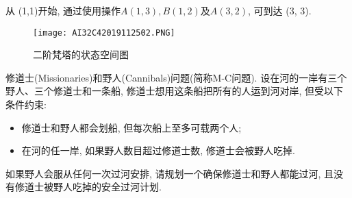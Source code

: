 \begin{example}
从 (1,1)开始, 通过使用操作$A(1, 3),B(1, 2)$及$A(3, 2)$, 可到达 (3, 3).
\begin{figure}[H]
\centering
\texttt{[image: AI32C42019112502.PNG]}
\caption{二阶梵塔的状态空间图}
\label{AI32fig2019120223}
\end{figure}
\end{example}
\begin{example}
  修道士(Missionaries)和野人(Cannibals)问题(简称M-C问题). 设在河的一岸有三个野人、三个修道士和一条船, 修道士想用这条船把所有的人运到河对岸, 但受以下条件约束:
\begin{itemize}
\item 修道士和野人都会划船, 但每次船上至多可载两个人;
\item 在河的任一岸, 如果野人数目超过修道士数, 修道士会被野人吃掉.
\end{itemize}

如果野人会服从任何一次过河安排, 请规划一个确保修道士和野人都能过河, 且没有修道士被野人吃掉的安全过河计划.
\end{example}
